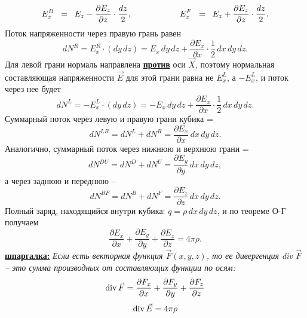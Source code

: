 \documentclass[12pt,epsfig,color,russian]{article}
\begin{document}
 \begin{displaymath}
  E_z^B\;\;=\;\; E_z-\frac{\partial E_z}{\partial z}\cdot\frac{dz}2,\hspace{20mm}
  E_z^F\;\;=\;\; E_z+\frac{\partial E_z}{\partial z}\cdot\frac{dz}2.
 \end{displaymath}
Поток напряженности через правую грань равен
 \begin{displaymath}
  dN^R=E_x^R\cdot (dy\,dz)= E_x\,dy\,dz+\frac{\partial E_x}{\partial x}\cdot\frac12\,dx\,dy\,dz.
 \end{displaymath}
Для левой грани нормаль направлена \underline{\bf против} оси $\vec{X}$, поэтому нормальная составляющая напряженности $\vec{E}$ для этой грани равна не $E_x^L$, а $-E_x^L$, и поток через нее будет\vspace{-3mm}
 \begin{displaymath}
  dN^L=-E_x^L\cdot (dy\,dz)= -E_x\,dy\,dz+\frac{\partial E_x}{\partial x}\cdot\frac12\,dx\,dy\,dz.
 \end{displaymath}
Суммарный поток через левую и правую грани кубика =
 \begin{displaymath}
  dN^{LR}=dN^L+dN^R=\frac{\partial E_x}{\partial x}\,dx\,dy\,dz.
 \end{displaymath}
Аналогично, суммарный поток через нижнюю и верхнюю грани =
 \begin{displaymath}
  dN^{DU}=dN^D+dN^U=\frac{\partial E_y}{\partial y}\,dx\,dy\,dz,
 \end{displaymath}
а через заднюю и переднюю --\vspace{-3mm}
 \begin{displaymath}
  dN^{BF}=dN^B+dN^F=\frac{\partial E_z}{\partial z}\,dx\,dy\,dz.
 \end{displaymath}
Полный заряд, находящийся внутри кубика: $q=\rho\,dx\,dy\,dz$, и по теореме О-Г получаем
 \begin{displaymath}
  \frac{\partial E_x}{\partial x}+\frac{\partial E_y}{\partial y}+\frac{\partial E_z}{\partial z}=4\pi\rho.
 \end{displaymath}
{\small\color{blue}  \underline{\bf шпаргалка:} {\em Если есть векторная функция $\vec{F}(x,y,z)$, то ее дивергенция div $\vec{F}$ -- это сумма производных от составляющих функции по осям:
 \begin{displaymath}
  {\rm div}\,\vec{F}=\frac{\partial F_x}{\partial x}+
  \frac{\partial F_y}{\partial y}+
  \frac{\partial F_z}{\partial z}\vspace{-3mm}
 \end{displaymath}
}}
 \begin{displaymath}
  {\rm div}\,\vec{E}=4\pi\rho
 \end{displaymath}
\end{document}
